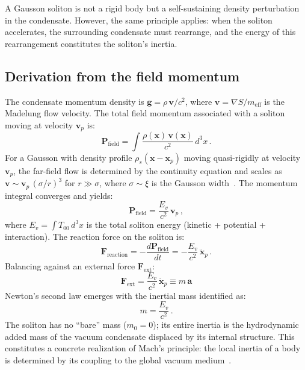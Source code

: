 \documentclass[12pt, a4paper]{article}
\newcommand{\meff}{m_{\mathrm{eff}}}
\begin{document}
A Gausson soliton is not a rigid body but a
self-sustaining density perturbation in the
condensate. However, the same principle applies: when
the soliton accelerates, the surrounding condensate
must rearrange, and the energy of this rearrangement
constitutes the soliton's inertia.

\subsection{Derivation from the field momentum}

The condensate momentum density is
$\mathbf{g} = \rho\,\mathbf{v}/c^2$, where
$\mathbf{v} = \nabla S/\meff$ is the Madelung flow
velocity. The total field momentum associated with a
soliton moving at velocity $\mathbf{v}_p$ is:
\begin{equation}
    \mathbf{P}_{\mathrm{field}}
    = \int \frac{\rho(\mathbf{x})\,
    \mathbf{v}(\mathbf{x})}{c^2}\,d^3x\,.
\label{eq:P_field}
\end{equation}
For a Gausson with density profile
$\rho_s(\mathbf{x} - \mathbf{x}_p)$ moving
quasi-rigidly at velocity $\mathbf{v}_p$, the
far-field flow is determined by the continuity
equation and scales as
$\mathbf{v} \sim \mathbf{v}_p\,(\sigma/r)^3$ for
$r \gg \sigma$, where $\sigma \sim \xi$ is the
Gausson width~\cite{kulangiev_planck}. The momentum
integral converges and yields:
\begin{equation}
    \mathbf{P}_{\mathrm{field}}
    = \frac{E_v}{c^2}\,\mathbf{v}_p\,,
\label{eq:P_Ev}
\end{equation}
where $E_v = \int T_{00}\,d^3x$ is the total soliton
energy (kinetic + potential + interaction). The
reaction force on the soliton is:
\begin{equation}
    \mathbf{F}_{\mathrm{reaction}}
    = -\frac{d\mathbf{P}_{\mathrm{field}}}{dt}
    = -\frac{E_v}{c^2}\,\ddot{\mathbf{x}}_p\,.
\label{eq:F_reaction}
\end{equation}
Balancing against an external force
$\mathbf{F}_{\mathrm{ext}}$:
\begin{equation}
    \boxed{\;\mathbf{F}_{\mathrm{ext}}
    = \frac{E_v}{c^2}\,\ddot{\mathbf{x}}_p
    \equiv m\,\mathbf{a}\;}
\label{eq:newton}
\end{equation}
Newton's second law emerges with the inertial mass
identified as:
\begin{equation}
    m = \frac{E_v}{c^2}\,.
\label{eq:m_Ev}
\end{equation}
The soliton has no ``bare'' mass ($m_0 = 0$); its
entire inertia is the hydrodynamic added mass of the
vacuum condensate displaced by its internal structure.
This constitutes a concrete realization of Mach's
principle: the local inertia of a body is determined
by its coupling to the global vacuum
medium~\cite{volovik_2003}.
\end{document}
